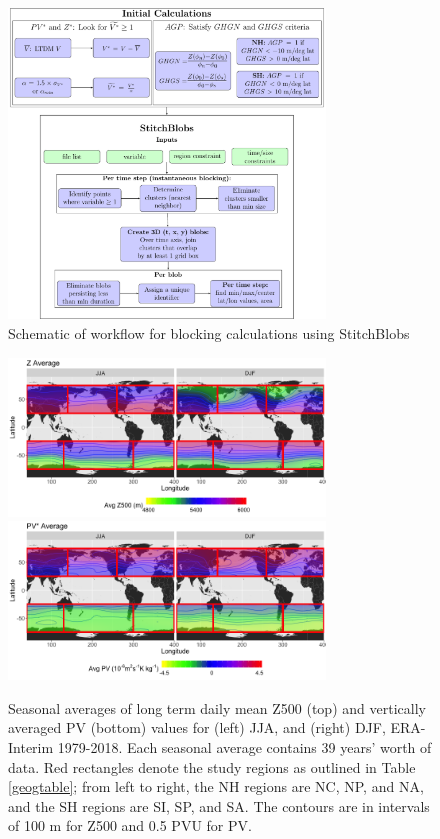 \documentclass[smallextended]{svjour3}       %
\numberwithin{equation}{section}
\begin{document}
\begin{figure}
\centering
\includegraphics[width=0.75\textwidth]{fig1.pdf}
\caption{Schematic of workflow for blocking calculations using StitchBlobs}\label{stitchfig}
\end{figure}

\begin{figure}
\centering
\includegraphics[width=0.75\textwidth]{fig2a}
\includegraphics[width=0.75\textwidth]{fig2b}
\caption{Seasonal averages of long term daily mean Z500 (top) and vertically averaged PV (bottom) values for (left) JJA, and (right) DJF, ERA-Interim 1979-2018. Each seasonal average contains 39 years' worth of data. Red rectangles denote the study regions as outlined in Table \ref{geogtable}; from left to right, the NH regions are NC, NP, and NA, and the SH regions are SI, SP, and SA. The contours are in intervals of 100 m for Z500 and 0.5 PVU for PV.
}\label{avg}
\end{figure}
\end{document}
